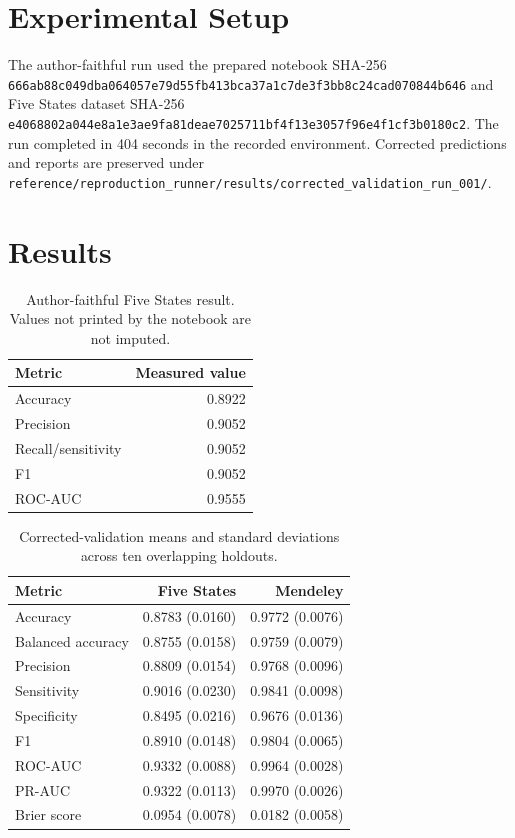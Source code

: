 \documentclass[11pt]{article}
\begin{document}
\section{Experimental Setup}
The author-faithful run used the prepared notebook SHA-256 \texttt{666ab88c049dba064057e79d55fb413bca37a1c7de3f3bb8c24cad070844b646} and Five States dataset SHA-256 \texttt{e4068802a044e8a1e3ae9fa81deae7025711bf4f13e3057f96e4f1cf3b0180c2}. The run completed in 404 seconds in the recorded environment. Corrected predictions and reports are preserved under \texttt{reference/reproduction\_runner/results/corrected\_validation\_run\_001/}.

\section{Results}
\begin{table}[ht]
\centering
\caption{Author-faithful Five States result. Values not printed by the notebook are not imputed.}
\begin{tabular}{lr}
\toprule
Metric & Measured value\\
\midrule
Accuracy & 0.8922\\
Precision & 0.9052\\
Recall/sensitivity & 0.9052\\
F1 & 0.9052\\
ROC-AUC & 0.9555\\
\bottomrule
\end{tabular}
\end{table}

\begin{table}[ht]
\centering
\caption{Corrected-validation means and standard deviations across ten overlapping holdouts.}
\begin{tabular}{lrr}
\toprule
Metric & Five States & Mendeley\\
\midrule
Accuracy & 0.8783 (0.0160) & 0.9772 (0.0076)\\
Balanced accuracy & 0.8755 (0.0158) & 0.9759 (0.0079)\\
Precision & 0.8809 (0.0154) & 0.9768 (0.0096)\\
Sensitivity & 0.9016 (0.0230) & 0.9841 (0.0098)\\
Specificity & 0.8495 (0.0216) & 0.9676 (0.0136)\\
F1 & 0.8910 (0.0148) & 0.9804 (0.0065)\\
ROC-AUC & 0.9332 (0.0088) & 0.9964 (0.0028)\\
PR-AUC & 0.9322 (0.0113) & 0.9970 (0.0026)\\
Brier score & 0.0954 (0.0078) & 0.0182 (0.0058)\\
\bottomrule
\end{tabular}
\end{table}
\end{document}
